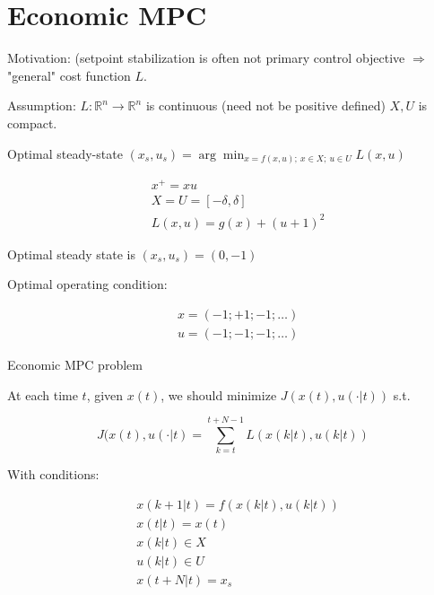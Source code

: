 \section{Economic MPC}

Motivation: (setpoint stabilization is often not primary control objective 
$\Rightarrow$ "general" cost function $L$.

Assumption: $L:\mathbb{R}^n\rightarrow\mathbb{R}^n$ is continuous (need not
be positive defined) $X,U$ is compact.

\begin{Definition}
 Optimal steady-state $(x_s,u_s)=\arg\min_{x=f(x,u);\ x\in X;\ u\in U}L(x,u)$
\end{Definition}

\begin{Example}
 \begin{equation*}
  \begin{split}
   &x^+=xu \\
   &X=U=[-\delta,\delta] \\
   &L(x,u)=g(x)+(u+1)^2
  \end{split}
 \end{equation*}

 Optimal steady state is $(x_s,u_s)=(0,-1)$

 Optimal operating condition:

 \begin{equation*}
  \begin{split}
   &x=(-1;+1;-1;\dots) \\
   &u=(-1;-1;-1;\dots)
  \end{split}
 \end{equation*}
\end{Example}


Economic MPC problem

At each time $t$, given $x(t)$, we should minimize $J(x(t),u(\cdot|t))$ s.t.

$$J(x(t),u(\cdot|t) = \sum_{k=t}^{t+N-1}L(x(k|t),u(k|t))$$

With conditions:

\begin{equation*}
 \begin{split}
  &x(k+1|t) = f(x(k|t),u(k|t)) \\
  &x(t|t) = x(t) \\
  &x(k|t)\in X \\
  &u(k|t)\in U \\
  &x(t+N|t) = x_s
 \end{split}
\end{equation*}

